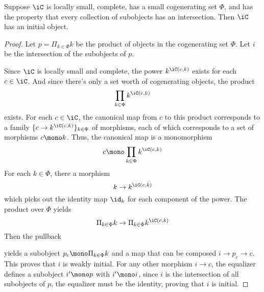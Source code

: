 \documentclass{amsart}
\begin{document}
\begin{lem}\label{lem:cogen-initial}
  Suppose $\iC$ is locally small, complete, has a small cogenerating set $\Phi$, and has the property that every collection of subobjects has an intersection.
  Then $\iC$ has an initial object.
\end{lem}
\begin{proof}
  Let $p = \Pi_{k \in \Phi}k$ be the product of objects in the cogenerating set $\Phi$.
  Let $i$ be the intersection of the subobjects of $p$.

  Since $\iC$ is locally small and complete, the power $k^{\iC(c,k)}$ exists for each $c \in \iC$.
  And since there's only a set worth of cogenerating objects, the product
  \[
    \prod_{k\in\Phi}k^{\iC(c,k)}
  \]
  exists.
  For each $c \in \iC$, the canonical map from $c$ to this product corresponds to a family $\{c \to k^{\iC(c,k)}\}_{k\in\Phi}$ of morphisms, each of which corresponds to a set of morphisms $c \mono k$.
  Thus, the canonical map is a monomorphism
  \[
    c \mono \prod_{k\in\Phi}k^{\iC(c,k)}
  \]
  For each $k \in \Phi$, there a morphism
  \[
    k \to k^{\iC(c,k)}
  \]
  which picks out the identity map $\id_{k}$ for each component of the power.
  The product over $\Phi$ yields
  \[
    \Pi_{k\in\Phi}k \to \Pi_{k\in\Phi}k^{\iC(c,k)}
  \]
  Then the pullback
  
  yields a subobject $p_{c} \mono \Pi_{k\in\Phi}k$ and a map that can be composed $i \to p_{c} \to c$.
  This proves that $i$ is weakly initial.
  For any other morphism $i \to c$, the equalizer defines a subobject $i' \mono p$ with $i' \mono i$, since $i$ is the intersection of all subobjects of $p$, the equalizer must be the identity, proving that $i$ is initial.
\end{proof}
\end{document}
